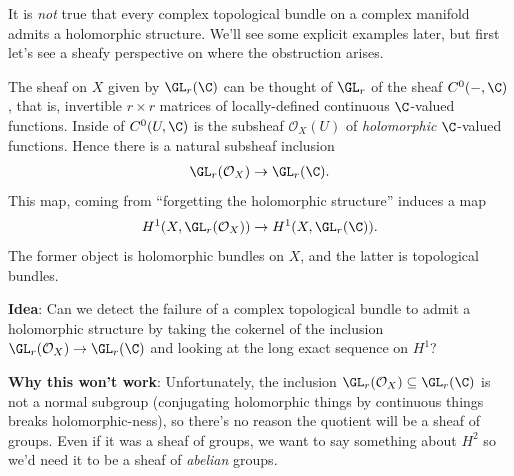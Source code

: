 \documentclass[11pt]{book}
\begin{document}
It is \emph{not} true that every complex topological bundle on a complex manifold admits a holomorphic structure. We'll see some explicit examples later, but first let's see a sheafy perspective on where the obstruction arises.

The sheaf on $X$ given by $\GL_r(\C)$ can be thought of $\GL_r$ of the sheaf $C^0(-,\C)$, that is, invertible $r \times r$ matrices of locally-defined continuous $\C$-valued functions. Inside of $C^0(U,\C)$ is the subsheaf $\mathcal{O}_X(U)$ of \emph{holomorphic} $\C$-valued functions. Hence there is a natural subsheaf inclusion
\begin{align*}
    \GL_r(\mathcal{O}_X) \to \GL_r(\C).
\end{align*}
This map, coming from ``forgetting the holomorphic structure'' induces a map
\begin{align*}
    H^1(X, \GL_r(\mathcal{O}_X)) \to H^1(X,\GL_r(\C)).
\end{align*}
The former object is holomorphic bundles on $X$, and the latter is topological bundles.

\textbf{Idea}: Can we detect the failure of a complex topological bundle to admit a holomorphic structure by taking the cokernel of the inclusion $\GL_r(\mathcal{O}_X) \to \GL_r(\C)$ and looking at the long exact sequence on $H^1$?

\textbf{Why this won't work}: Unfortunately, the inclusion $\GL_r(\mathcal{O}_X) \subseteq \GL_r(\C)$ is not a normal subgroup (conjugating holomorphic things by continuous things breaks holomorphic-ness), so there's no reason the quotient will be a sheaf of groups. Even if it was a sheaf of groups, we want to say something about $H^2$ so we'd need it to be a sheaf of \emph{abelian} groups.
\end{document}
